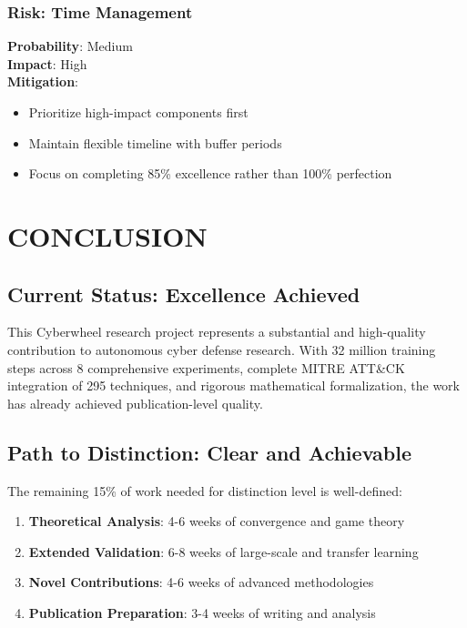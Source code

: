 \documentclass[11pt]{article}
\begin{document}
\subsubsection{Risk: Time Management}
\textbf{Probability}: Medium \\
\textbf{Impact}: High \\
\textbf{Mitigation}:
\begin{itemize}
\item Prioritize high-impact components first
\item Maintain flexible timeline with buffer periods
\item Focus on completing 85\% excellence rather than 100\% perfection
\end{itemize}

\section{CONCLUSION}

\subsection{Current Status: Excellence Achieved}

This Cyberwheel research project represents a substantial and high-quality contribution to autonomous cyber defense research. With 32 million training steps across 8 comprehensive experiments, complete MITRE ATT\&CK integration of 295 techniques, and rigorous mathematical formalization, the work has already achieved publication-level quality.

\subsection{Path to Distinction: Clear and Achievable}

The remaining 15\% of work needed for distinction level is well-defined:
\begin{enumerate}
\item \textbf{Theoretical Analysis}: 4-6 weeks of convergence and game theory
\item \textbf{Extended Validation}: 6-8 weeks of large-scale and transfer learning
\item \textbf{Novel Contributions}: 4-6 weeks of advanced methodologies
\item \textbf{Publication Preparation}: 3-4 weeks of writing and analysis
\end{enumerate}
\end{document}
